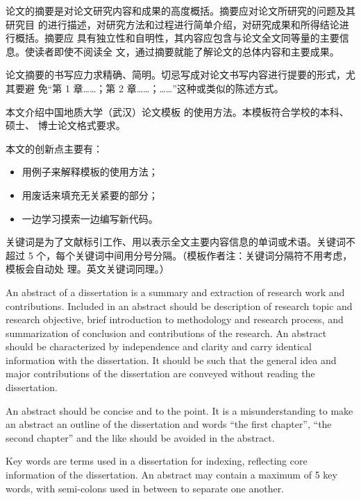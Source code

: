 \begin{cabstract}
	论文的摘要是对论文研究内容和成果的高度概括。摘要应对论文所研究的问题及其研究目
	的进行描述，对研究方法和过程进行简单介绍，对研究成果和所得结论进行概括。摘要应
	具有独立性和自明性，其内容应包含与论文全文同等量的主要信息。使读者即使不阅读全
	文，通过摘要就能了解论文的总体内容和主要成果。
	
	论文摘要的书写应力求精确、简明。切忌写成对论文书写内容进行提要的形式，尤其要避
	免“第 1 章……；第 2 章……；……”这种或类似的陈述方式。
	
	本文介绍中国地质大学（武汉）论文模板 \cugthesis{} 的使用方法。本模板符合学校的本科、硕士、
	博士论文格式要求。
	
	本文的创新点主要有：
	\begin{itemize}
		\item 用例子来解释模板的使用方法；
		\item 用废话来填充无关紧要的部分；
		\item 一边学习摸索一边编写新代码。
	\end{itemize}
	
	关键词是为了文献标引工作、用以表示全文主要内容信息的单词或术语。关键词不超过 5
	个，每个关键词中间用分号分隔。（模板作者注：关键词分隔符不用考虑，模板会自动处
	理。英文关键词同理。）
\end{cabstract}


\begin{eabstract}
	An abstract of a dissertation is a summary and extraction of research work
	and contributions. Included in an abstract should be description of research
	topic and research objective, brief introduction to methodology and research
	process, and summarization of conclusion and contributions of the
	research. An abstract should be characterized by independence and clarity and
	carry identical information with the dissertation. It should be such that the
	general idea and major contributions of the dissertation are conveyed without
	reading the dissertation.
	
	An abstract should be concise and to the point. It is a misunderstanding to
	make an abstract an outline of the dissertation and words ``the first
	chapter'', ``the second chapter'' and the like should be avoided in the
	abstract.
	
	Key words are terms used in a dissertation for indexing, reflecting core
	information of the dissertation. An abstract may contain a maximum of 5 key
	words, with semi-colons used in between to separate one another.
\end{eabstract}

